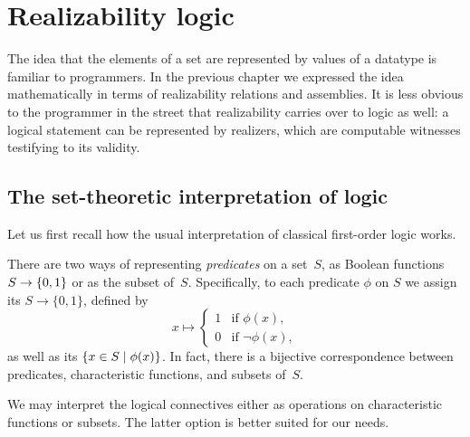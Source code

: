 \chapter{Realizability logic}
\label{sec:realizability-interpretation}

The idea that the elements of a set are represented by values of a datatype is familiar to programmers. In the previous chapter we expressed the idea mathematically in terms of realizability relations and assemblies. It is less obvious to the programmer in the street that realizability carries over to logic as well: a logical statement can be represented by realizers, which are computable witnesses testifying to its validity.

\section{The set-theoretic interpretation of logic}
\label{sec:interpr-logic-set-theoretic}

Let us first recall how the usual interpretation of classical
first-order logic works.

There are two ways of representing \emph{predicates} on a set~$S$,
as Boolean functions $S \to \{0, 1\}$ or as the subset of~$S$.
Specifically, to each predicate $\phi$ on $S$ we assign its  $S \to \{0, 1\}$, defined by
%
\begin{equation*}
  x \mapsto
  \begin{cases}
    1 &\text{if $\phi(x)$,}\\
    0 &\text{if $\lnot \phi(x)$},
  \end{cases}
\end{equation*}
%
as well as its  $\{x \in S \mid \phi(x)\}$. In fact, there is a bijective correspondence between predicates, characteristic functions, and subsets of~$S$.

We may interpret the logical connectives either as operations on characteristic functions or subsets. The latter option is better suited for our needs.

